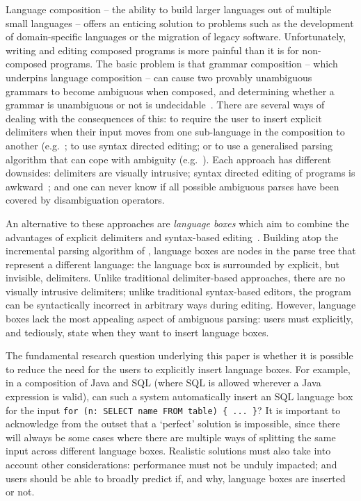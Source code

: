 \documentclass[sigplan,screen]{acmart}\settopmatter{printfolios=true,printccs=false,printacmref=false}
\begin{document}
Language composition -- the ability to build larger languages out of multiple
small languages -- offers an enticing solution to problems such as the
development of domain-specific languages or the migration of legacy software.
Unfortunately, writing and editing composed programs is more painful
than it is for non-composed programs. The basic problem is that grammar
composition -- which underpins language composition -- can cause
two provably unambiguous grammars to become ambiguous when composed,
and determining whether a grammar is unambiguous or not is
undecidable~\cite{cantor62ambiguity}. There are several ways
of dealing with the consequences of this: to require the user to insert
explicit delimiters when their input moves from one sub-language in the
composition to another (e.g.~\cite{wyk07context}; to use syntax directed
editing; or to use a generalised parsing algorithm that can cope with ambiguity
(e.g.~\cite{visser97sdf}). Each approach has different downsides: delimiters
are visually intrusive; syntax directed editing of programs is
awkward~\cite[p.~2]{khwaja93syntax}; and one can never know if all possible
ambiguous parses have been covered by disambiguation operators.

An alternative to these approaches are \emph{language boxes} which aim to
combine the advantages of explicit delimiters and syntax-based
editing~\cite{diekmann14eco}. Building atop the incremental parsing algorithm
of \citet{wagner98practicalalgorithms}, language boxes are nodes in the parse
tree that represent a different language: the language box is surrounded by
explicit, but invisible, delimiters. Unlike traditional delimiter-based
approaches, there are no visually intrusive delimiters; unlike traditional
syntax-based editors, the program can be syntactically incorrect in arbitrary
ways during editing. However, language boxes lack the most appealing aspect of
ambiguous parsing: users must explicitly, and tediously, state when they want
to insert language boxes.

The fundamental research question underlying this paper is whether it is
possible to reduce the need for the users to explicitly insert language
boxes. For example, in a composition of Java and SQL (where SQL is allowed
wherever a Java expression is valid), can such a system automatically insert an
SQL language box for the input \texttt{for (n: SELECT name FROM table) \{ ...
\}}? It is important to acknowledge from the outset that a `perfect' solution
is impossible, since there will always be some cases where there are multiple
ways of splitting the same input across different language boxes. Realistic
solutions must also take into account other considerations: performance must
not be unduly impacted; and users should be able to broadly predict if, and
why, language boxes are inserted or not.
\end{document}
